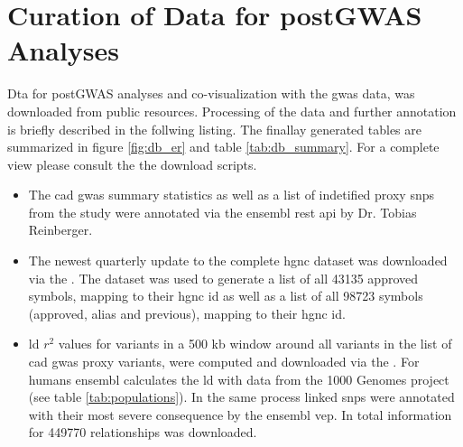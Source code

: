 \section{Curation of Data for postGWAS Analyses}
\label{sec:database}
Dta for postGWAS analyses and co-visualization with the \ac{gwas} data, was downloaded from public resources. Processing of the data and further annotation is briefly described in the follwing listing. The finallay generated tables are summarized in figure \ref{fig:db_er} and table \ref{tab:db_summary}. For a complete view please consult the the download scripts.

\begin{itemize}
    \item {} The \ac{cad} \ac{gwas} summary statistics as well as a list of indetified proxy \acp{snp} from the study were annotated via the ensembl \ac{rest} \ac{api} by Dr. Tobias Reinberger.

    \item {} The newest quarterly update to the complete \ac{hgnc} dataset was downloaded via the . The dataset was used to generate a list of all 43135 approved symbols, mapping to their \ac{hgnc} id as well as a list of all 98723 symbols (approved, alias and previous), mapping to their \ac{hgnc} id.

    \item {} \ac{ld} $r^2$ values for variants in a 500 kb window around all variants in the list of \ac{cad} \ac{gwas} proxy variants, were computed and downloaded via the . For humans ensembl calculates the \ac{ld} with data from the 1000 Genomes project (see table \ref{tab:populations}). In the same process linked \acp{snp} were annotated with their most severe consequence by the ensembl \ac{vep}. In total information for 449770 relationships was downloaded.


\end{itemize}
